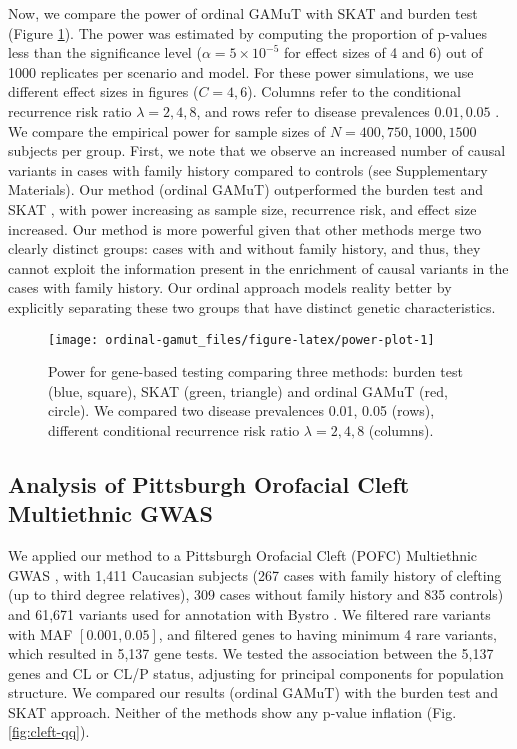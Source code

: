 \documentclass[]{article}
\begin{document}
Now, we compare the power of ordinal GAMuT with SKAT and burden test
(Figure \ref{fig:power-plot}). The power was estimated by computing the
proportion of p-values less than the significance level
(\(\alpha=5 \times 10^{-5}\) for effect sizes of 4 and 6) out of 1000
replicates per scenario and model. For these power simulations, we use
different effect sizes in figures (\(C=4,6\)). Columns refer to the
conditional recurrence risk ratio \(\lambda=2,4,8\), and rows refer to
disease prevalences \(0.01,0.05\) . We compare the empirical power for
sample sizes of \(N=400,750,1000,1500\) subjects per group. First, we
note that we observe an increased number of causal variants in cases
with family history compared to controls (see Supplementary Materials).
Our method (ordinal GAMuT) outperformed the burden test
\citep{Li2008, Madsen2009} and SKAT \citep{Wu2011}, with power
increasing as sample size, recurrence risk, and effect size increased.
Our method is more powerful given that other methods merge two clearly
distinct groups: cases with and without family history, and thus, they
cannot exploit the information present in the enrichment of causal
variants in the cases with family history. Our ordinal approach models
reality better by explicitly separating these two groups that have
distinct genetic characteristics.

\begin{figure}

{\centering \texttt{[image: ordinal-gamut\_files/figure-latex/power-plot-1]} 

}

\caption{Power for gene-based testing comparing three methods: burden test (blue, square), SKAT (green, triangle) and ordinal GAMuT (red, circle). We compared two disease prevalences 0.01, 0.05 (rows), different conditional recurrence risk ratio $\lambda=2,4,8$ (columns).}\label{fig:power-plot}
\end{figure}

\hypertarget{analysis-of-pittsburgh-orofacial-cleft-multiethnic-gwas-1}{%
\subsection{Analysis of Pittsburgh Orofacial Cleft Multiethnic
GWAS}\label{analysis-of-pittsburgh-orofacial-cleft-multiethnic-gwas-1}}

We applied our method to a Pittsburgh Orofacial Cleft (POFC) Multiethnic
GWAS \citep{Leslie2016}, \citep{Leslie2016b} with 1,411 Caucasian
subjects (267 cases with family history of clefting (up to third degree
relatives), 309 cases without family history and 835 controls) and
61,671 variants used for annotation with Bystro \citep{Kotlar2018}. We
filtered rare variants with MAF \([0.001,0.05]\), and filtered genes to
having minimum 4 rare variants, which resulted in 5,137 gene tests. We
tested the association between the 5,137 genes and CL or CL/P status,
adjusting for principal components for population structure. We compared
our results (ordinal GAMuT) with the burden test and SKAT approach.
Neither of the methods show any p-value inflation (Fig.
\ref{fig:cleft-qq}).
\end{document}
